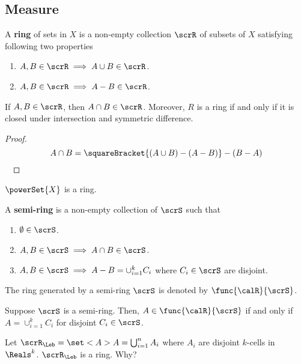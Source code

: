\subsection{Measure}
\begin{definition}
    A \textbf{ring} of sets in \(X\) is a non-empty collection \(\scrR\) of subsets of \(X\) satisfying following two properties
    \begin{enumerate}
        \item \(A,B \in \scrR \implies A \cup B \in \scrR\).
        \item \(A,B \in \scrR \implies A - B \in \scrR\).
    \end{enumerate}
\end{definition}
\begin{lemma}
    If \(A,B \in \scrR\), then \(A \cap B \in \scrR\). Moreover, \(R\) is a ring if and only if it is closed under intersection and symmetric difference.
\end{lemma}
\begin{proof}
    \begin{equation*}
        A \cap B = \squareBracket{(A \cup B) - (A - B)} - (B - A)
    \end{equation*}
    \
\end{proof}
\begin{example}
    \(\powerSet{X}\) is a ring.
\end{example}

\begin{definition}
    A \textbf{semi-ring} is a non-empty collection of \(\scrS\) such that 
    \begin{enumerate}
        \item \(\emptyset \in \scrS\).
        \item \(A,B \in \scrS \implies A \cap B \in \scrS\).
        \item \(A,B \in \scrS \implies A - B = \cup_{i = 1}^k C_i\) where \(C_i \in \scrS\) are disjoint.
    \end{enumerate}
    The ring generated by a semi-ring \(\scrS\) is denoted by \(\func{\calR}{\scrS}\).
\end{definition}

\begin{theorem}
    Suppose \(\scrS\) is a semi-ring. Then, \(A \in \func{\calR}{\scrS}\) if and only if \(A = \cup_{i = 1}^k C_i\) for disjoint \(C_i \in \scrS\).
\end{theorem}

\begin{example}
    Let \(\scrR_{\Leb} = \set<A>{A = \bigcup_{i = 1}^n A_i}\) where \(A_i\) are disjoint \(k\)-cells in \(\Reals^k\). \(\scrR_{\Leb}\) is a ring. Why?
\end{example}


